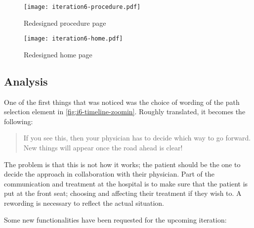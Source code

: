 \begin{figure}
    \centering
    \begin{minipage}[t]{0.45\textwidth}
        \centering
        \vspace{0pt}
        \texttt{[image: iteration6-procedure.pdf]}
        \caption{Redesigned procedure page}
        \label{fig:i6-procedure}
    \end{minipage}
    \begin{minipage}[t]{0.45\textwidth}
        \centering
        \vspace{0pt}
        \texttt{[image: iteration6-home.pdf]}
        \caption{Redesigned home page}
        \label{fig:i6-home}
    \end{minipage}
\end{figure}

\subsection{Analysis}

One of the first things that was noticed was the choice of wording of the path selection element in \autoref{fig:i6-timeline-zoomin}. Roughly translated, it becomes the following:

\begin{quote}
    If you see this, then your physician has to decide which way to go forward. New things will appear once the road ahead is clear!
\end{quote}

The problem is that this is not how it works; the patient should be the one to decide the approach in collaboration with their physician. Part of the communication and treatment at the hospital is to make sure that the patient is put at the front seat; choosing and affecting their treatment if they wish to. A rewording is necessary to reflect the actual situation.

Some new functionalities have been requested for the upcoming iteration:

